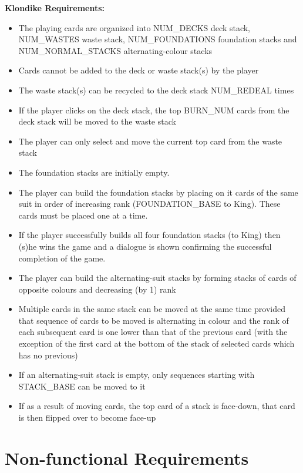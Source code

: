 \documentclass[12pt, titlepage]{article}
\begin{document}
		\indent \textbf{Klondike Requirements:} \label{Kreq}
		\vspace{-2mm}
		\begin{itemize}
			\itemsep0em
			\item The playing cards are organized into NUM\_DECKS deck stack, 
			NUM\_WASTES waste stack, NUM\_FOUNDATIONS foundation stacks and 
			NUM\_NORMAL\_STACKS alternating-colour stacks
			\item Cards cannot be added to the deck or waste stack(s) by the 
			player
			\item The waste stack(s) can be recycled to the deck stack 
			NUM\_REDEAL times
			\item If the player clicks on the deck stack, the top BURN\_NUM 
			cards from the deck stack will be moved to the waste stack
			\item The player can only select and move the current top card from 
			the waste stack
			\item The foundation stacks are initially empty.
			\item The player can build the foundation stacks by placing on it 
			cards of the same suit in order of increasing rank 
			(FOUNDATION\_BASE to King). These cards must be placed one at a time.
			\item If the player successfully builds all four foundation stacks 
			(to King) then (s)he wins the game and a dialogue is shown 
			confirming the successful completion of the game.
			\item The player can build the alternating-suit stacks by forming 
			stacks of cards of opposite colours and decreasing (by 1) rank
			\item Multiple cards in the same stack can be moved at the same 
			time provided that sequence of cards to be moved is alternating in 
			colour and the rank of each subsequent card is one lower than that 
			of the previous card (with the exception of the first card at the 
			bottom of the stack of selected cards which has no previous)
			\item If an alternating-suit stack is empty, only sequences 
			starting with STACK\_BASE can be moved to it
			\item If as a result of moving cards, the top card of a stack is 
			face-down, that card is then flipped over to become face-up
		\end{itemize}
	
	\section{Non-functional Requirements}
\end{document}
